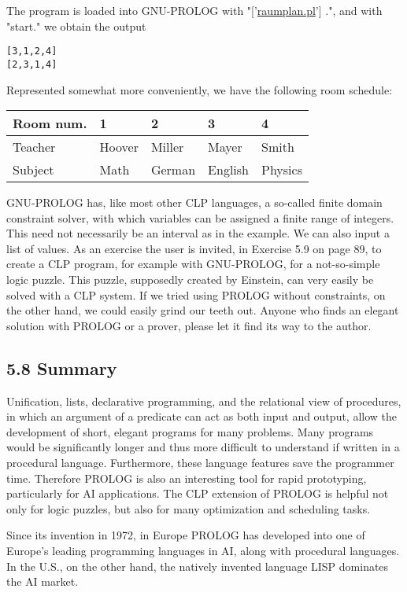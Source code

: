 \documentclass[10pt]{article}
\begin{document}
The program is loaded into GNU-PROLOG with "['\href{http://raumplan.pl}{raumplan.pl}'] .", and with "start." we obtain the output

\begin{verbatim}
[3,1,2,4]
[2,3,1,4]
\end{verbatim}

Represented somewhat more conveniently, we have the following room schedule:

\begin{center}
\begin{tabular}{lllll}
\hline
Room num. & 1 & 2 & 3 & 4 \\
\hline
Teacher & Hoover & Miller & Mayer & Smith \\
\hline
Subject & Math & German & English & Physics \\
\hline
\end{tabular}
\end{center}

GNU-PROLOG has, like most other CLP languages, a so-called finite domain constraint solver, with which variables can be assigned a finite range of integers. This need not necessarily be an interval as in the example. We can also input a list of values. As an exercise the user is invited, in Exercise 5.9 on page 89, to create a CLP program, for example with GNU-PROLOG, for a not-so-simple logic puzzle. This puzzle, supposedly created by Einstein, can very easily be solved with a CLP system. If we tried using PROLOG without constraints, on the other hand, we could easily grind our teeth out. Anyone who finds an elegant solution with PROLOG or a prover, please let it find its way to the author.

\subsection*{5.8 Summary}
Unification, lists, declarative programming, and the relational view of procedures, in which an argument of a predicate can act as both input and output, allow the development of short, elegant programs for many problems. Many programs would be significantly longer and thus more difficult to understand if written in a procedural language. Furthermore, these language features save the programmer time. Therefore PROLOG is also an interesting tool for rapid prototyping, particularly for AI applications. The CLP extension of PROLOG is helpful not only for logic puzzles, but also for many optimization and scheduling tasks.

Since its invention in 1972, in Europe PROLOG has developed into one of Europe's leading programming languages in AI, along with procedural languages. In the U.S., on the other hand, the natively invented language LISP dominates the AI market.
\end{document}
